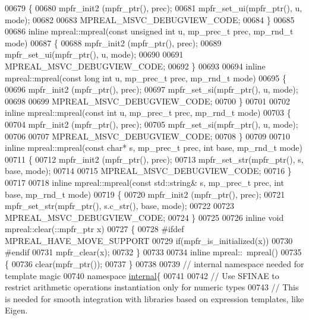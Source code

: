 \begin{DoxyCode}
00679 \{
00680     mpfr\_init2 (mpfr\_ptr(), prec);
00681     mpfr\_set\_ui(mpfr\_ptr(), u, mode);
00682 
00683     MPREAL\_MSVC\_DEBUGVIEW\_CODE;
00684 \}
00685 
00686 \textcolor{keyword}{inline} mpreal::mpreal(\textcolor{keyword}{const} \textcolor{keywordtype}{unsigned} \textcolor{keywordtype}{int} u, mp\_prec\_t prec, mp\_rnd\_t mode)
00687 \{
00688     mpfr\_init2 (mpfr\_ptr(), prec);
00689     mpfr\_set\_ui(mpfr\_ptr(), u, mode);
00690 
00691     MPREAL\_MSVC\_DEBUGVIEW\_CODE;
00692 \}
00693 
00694 \textcolor{keyword}{inline} mpreal::mpreal(\textcolor{keyword}{const} \textcolor{keywordtype}{long} \textcolor{keywordtype}{int} u, mp\_prec\_t prec, mp\_rnd\_t mode)
00695 \{
00696     mpfr\_init2 (mpfr\_ptr(), prec);
00697     mpfr\_set\_si(mpfr\_ptr(), u, mode);
00698 
00699     MPREAL\_MSVC\_DEBUGVIEW\_CODE;
00700 \}
00701 
00702 \textcolor{keyword}{inline} mpreal::mpreal(\textcolor{keyword}{const} \textcolor{keywordtype}{int} u, mp\_prec\_t prec, mp\_rnd\_t mode)
00703 \{
00704     mpfr\_init2 (mpfr\_ptr(), prec);
00705     mpfr\_set\_si(mpfr\_ptr(), u, mode);
00706 
00707     MPREAL\_MSVC\_DEBUGVIEW\_CODE;
00708 \}
00709 
00710 \textcolor{keyword}{inline} mpreal::mpreal(\textcolor{keyword}{const} \textcolor{keywordtype}{char}* s, mp\_prec\_t prec, \textcolor{keywordtype}{int} base, mp\_rnd\_t mode)
00711 \{
00712     mpfr\_init2  (mpfr\_ptr(), prec);
00713     mpfr\_set\_str(mpfr\_ptr(), s, base, mode);
00714 
00715     MPREAL\_MSVC\_DEBUGVIEW\_CODE;
00716 \}
00717 
00718 \textcolor{keyword}{inline} mpreal::mpreal(\textcolor{keyword}{const} std::string& s, mp\_prec\_t prec, \textcolor{keywordtype}{int} base, mp\_rnd\_t mode)
00719 \{
00720     mpfr\_init2  (mpfr\_ptr(), prec);
00721     mpfr\_set\_str(mpfr\_ptr(), s.c\_str(), base, mode);
00722 
00723     MPREAL\_MSVC\_DEBUGVIEW\_CODE;
00724 \}
00725 
00726 \textcolor{keyword}{inline} \textcolor{keywordtype}{void} mpreal::clear(::mpfr\_ptr x)
00727 \{
00728 \textcolor{preprocessor}{#ifdef MPREAL\_HAVE\_MOVE\_SUPPORT}
00729     \textcolor{keywordflow}{if}(mpfr\_is\_initialized(x))
00730 \textcolor{preprocessor}{#endif}
00731     mpfr\_clear(x);
00732 \}
00733 
00734 \textcolor{keyword}{inline} mpreal::~mpreal()
00735 \{
00736     clear(mpfr\_ptr());
00737 \}
00738 
00739 \textcolor{comment}{// internal namespace needed for template magic}
00740 \textcolor{keyword}{namespace }\hyperlink{namespaceinternal}{internal}\{
00741 
00742     \textcolor{comment}{// Use SFINAE to restrict arithmetic operations instantiation only for numeric types}
00743     \textcolor{comment}{// This is needed for smooth integration with libraries based on expression templates, like Eigen.}

\end{DoxyCode}
